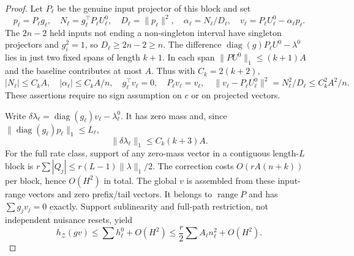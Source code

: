 \documentclass[11pt]{article}
\begin{document}
\begin{proof}
Let $P_\ell$ be the genuine input projector of this block and set
\[
p_\ell=P_\ell g_\ell,\quad N_\ell=g_\ell^\top P_\ell U_\ell^0,\quad
D_\ell=\|p_\ell\|^2,\quad
\alpha_\ell=N_\ell/D_\ell,\quad
v_\ell=P_\ell U_\ell^0-\alpha_\ell p_\ell.
\]
The $2n-2$ held inputs not ending a non-singleton interval have singleton
projectors and $g_i^2=1$, so $D_\ell\ge2n-2\ge n$.
The difference $\operatorname{diag}(g)P_\ell U^0-\lambda^0$ lies in just two fixed spans of length
$k+1$. In each span $\|P U^0\|_1\le(k+1)A$ and the baseline contributes
at most $A$. Thus with $C_k=2(k+2)$,
\[
|N_\ell|\le C_kA,\quad
|\alpha_\ell|\le C_kA/n,\quad
g_\ell^\top v_\ell=0,\quad P_\ell v_\ell=v_\ell,\quad
\|v_\ell-P_\ell U_\ell^0\|^2=N_\ell^2/D_\ell\le C_k^2A^2/n.
\]
These assertions require no sign assumption on $c$ or on projected vectors.

Write $\delta\lambda_\ell=\operatorname{diag}(g_\ell)v_\ell-\lambda_\ell^0$.
It has zero mass and, since $\|\operatorname{diag}(g_\ell)p_\ell\|_1\le L_\ell$,
\[
\|\delta\lambda_\ell\|_1\le C_k(k+3)A.
\]
For the full rate class, support of any zero-mass vector in a contiguous
length-$L$ block is $r\sum|Q_j|\le r(L-1)\|\lambda\|_1/2$.
The correction costs $O(rA(n+k))$ per block, hence $O(H^2)$ in total.
The global $v$ is assembled from these input-range vectors and zero
prefix/tail vectors. It belongs to $\operatorname{range}P$ and has
$\sum g_jv_j=0$ exactly.
Support sublinearity and full-path restriction, not independent nuisance
resets, yield
\begin{equation}\label{eq:supportupper}
h_{\mathcal Z}(gv)\le\sum h_\ell^0+O(H^2)
\le\frac r2\sum A_\ell n_\ell^2+O(H^2).
\end{equation}


\end{proof}
\end{document}

